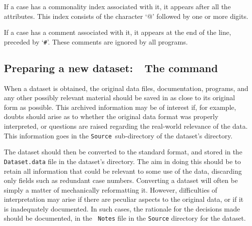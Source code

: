 If a case has a commonality index associated with it, it appears after
all the attributes.  This index consists of the character `@'
followed by one or more digits.  

If a case has a comment associated with it, it appears at the end of
the line, preceded by `{\tt \#}'.  These comments are ignored by 
all \delve{} programs.


\subsection{Preparing a new dataset:~~The \dcheck{} command}\label{data-prepare}

When a dataset is obtained, the original data files, documentation,
programs, and any other possibly relevant material should be saved in
as close to its original form as possible.  This archived information
may be of interest if, for example, doubts should arise as to whether
the original data format was properly interpreted, or questions are
raised regarding the real-world relevance of the data.  This information
goes in the {\tt Source}\ sub-directory of the dataset's directory.

The dataset should then be converted to the standard \delve{} format,
and stored in the {\tt Dataset.data} file in the dataset's directory.
The aim in doing this should be to retain all information that could
be relevant to some use of the data, discarding only fields such as
redundant case numbers.  Converting a dataset will often be simply a
matter of mechanically reformatting it.  However, difficulties of
interpretation may arise if there are peculiar aspects to the original
data, or if it is inadequately documented.  In such cases, the
rationale for the decisions made should be documented, in the {\tt
Notes} file in the {\tt Source} directory for the dataset.

